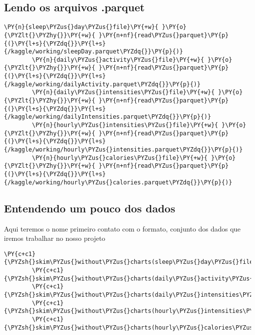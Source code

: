 \subsection{Lendo os arquivos .parquet}

\begin{tcolorbox}[breakable, size=fbox, boxrule=1pt, pad at break*=1mm,colback=cellbackground, colframe=cellborder]
    \begin{Verbatim}[commandchars=\\\{\}]
        \PY{n}{sleep\PYZus{}day\PYZus{}file}\PY{+w}{ }\PY{o}{\PYZlt{}\PYZhy{}}\PY{+w}{ }\PY{n+nf}{read\PYZus{}parquet}\PY{p}{(}\PY{l+s}{\PYZdq{}}\PY{l+s}{/kaggle/working/sleepDay.parquet\PYZdq{}}\PY{p}{)}
        \PY{n}{daily\PYZus{}activity\PYZus{}file}\PY{+w}{ }\PY{o}{\PYZlt{}\PYZhy{}}\PY{+w}{ }\PY{n+nf}{read\PYZus{}parquet}\PY{p}{(}\PY{l+s}{\PYZdq{}}\PY{l+s}{/kaggle/working/dailyActivity.parquet\PYZdq{}}\PY{p}{)}
        \PY{n}{daily\PYZus{}intensities\PYZus{}file}\PY{+w}{ }\PY{o}{\PYZlt{}\PYZhy{}}\PY{+w}{ }\PY{n+nf}{read\PYZus{}parquet}\PY{p}{(}\PY{l+s}{\PYZdq{}}\PY{l+s}{/kaggle/working/dailyIntensities.parquet\PYZdq{}}\PY{p}{)}
        \PY{n}{hourly\PYZus{}intensities\PYZus{}file}\PY{+w}{ }\PY{o}{\PYZlt{}\PYZhy{}}\PY{+w}{ }\PY{n+nf}{read\PYZus{}parquet}\PY{p}{(}\PY{l+s}{\PYZdq{}}\PY{l+s}{/kaggle/working/hourly\PYZus{}intensities.parquet\PYZdq{}}\PY{p}{)}
        \PY{n}{hourly\PYZus{}calories\PYZus{}file}\PY{+w}{ }\PY{o}{\PYZlt{}\PYZhy{}}\PY{+w}{ }\PY{n+nf}{read\PYZus{}parquet}\PY{p}{(}\PY{l+s}{\PYZdq{}}\PY{l+s}{/kaggle/working/hourly\PYZus{}calories.parquet\PYZdq{}}\PY{p}{)}
    \end{Verbatim}
\end{tcolorbox}


\subsection{Entendendo um pouco dos dados}

Aqui teremos o nome primeiro contato com o formato, conjunto dos dados
que iremos trabalhar no nosso projeto

\begin{tcolorbox}[breakable, size=fbox, boxrule=1pt, pad at break*=1mm,colback=cellbackground, colframe=cellborder]
    \begin{Verbatim}[commandchars=\\\{\}]
        \PY{c+c1}{\PYZsh{}skim\PYZus{}without\PYZus{}charts(sleep\PYZus{}day\PYZus{}file)}
        \PY{c+c1}{\PYZsh{}skim\PYZus{}without\PYZus{}charts(daily\PYZus{}activity\PYZus{}file)}
        \PY{c+c1}{\PYZsh{}skim\PYZus{}without\PYZus{}charts(daily\PYZus{}intensities\PYZus{}file)}
        \PY{c+c1}{\PYZsh{}skim\PYZus{}without\PYZus{}charts(hourly\PYZus{}intensities\PYZus{}file)}
        \PY{c+c1}{\PYZsh{}skim\PYZus{}without\PYZus{}charts(hourly\PYZus{}calories\PYZus{}file)}
    \end{Verbatim}
\end{tcolorbox}


